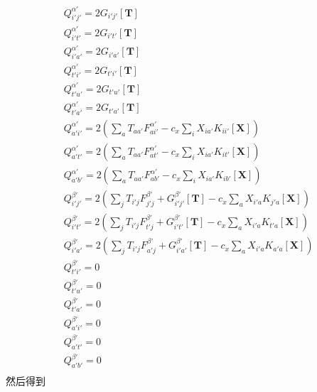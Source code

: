 \documentclass[11pt]{ctexart}
\numberwithin{equation}{section}
\begin{document}
\begin{equation}
    \begin{aligned}
        & Q_{i' j'}^{\alpha'} = 2G_{i' j'}[\mathbf{T}]\\
        & Q_{i' t'}^{\alpha'} = 2G_{i't'}[\mathbf{T}]\\
        & Q_{i' a'}^{\alpha'} = 2G_{i' a'}[\mathbf{T}]\\
        & Q_{t' i'}^{\alpha'} = 2G_{t'i'}[\mathbf{T}]\\
        & Q_{t' u'}^{\alpha'} = 2G_{t'u'}[\mathbf{T}]\\
        & Q_{t' a'}^{\alpha'} = 2G_{t'a'}[\mathbf{T}]\\
        & Q_{a' i'}^{\alpha'} = 2\left(
            \sum_{a}T_{aa'}F_{a i'}^{\alpha'} 
            - c_x\sum_{i}X_{ia'}K_{ii'}[\mathbf{X}]
        \right)\\
        & Q_{a' t'}^{\alpha'} = 2\left(
            \sum_{a}T_{aa'}F_{at'}^{\alpha'}
            - c_x\sum_{i}X_{ia'}K_{it'}[\mathbf{X}]
        \right)\\
        & Q_{a' b'}^{\alpha'} = 2\left(
            \sum_{a}T_{aa'}F_{ab'}^{\alpha'}
            - c_x\sum_{i}X_{ia'}K_{ib'}[\mathbf{X}]
        \right)\\
        & Q_{i' j'}^{\beta'} = 2\left(
            \sum_{j}T_{i'j}F_{j'j}^{\beta'}
            + G_{i'j'}^{\beta'}[\mathbf{T}]
            - c_x \sum_{a}X_{i'a}K_{j'a}[\mathbf{X}]
        \right)\\
        & Q_{i' t'}^{\beta'} = 2\left(
            \sum_{j}T_{i'j}F_{t'j}^{\beta'}
            + G_{i't'}^{\beta'}[\mathbf{T}]
            - c_x\sum_{a}X_{i'a}K_{t'a}[\mathbf{X}]
        \right)\\
        & Q_{i' a'}^{\beta'} = 2\left(
            \sum_{j}T_{i'j}F_{a' j}^{\beta'} 
            + G_{i' a'}^{\beta'}[\mathbf{T}]
            - c_x\sum_{a}X_{i' a}K_{a'a}[\mathbf{X}]
        \right)\\
        & Q_{t'i'}^{\beta'} = 0\\
        & Q_{t'u'}^{\beta'} = 0\\
        & Q_{t'a'}^{\beta'} = 0\\
        & Q_{a' i'}^{\beta'} = 0\\
        & Q_{a't'}^{\beta'} = 0\\
        & Q_{a' b'}^{\beta'} = 0\\
    \end{aligned}
\end{equation}
然后得到
\end{document}
